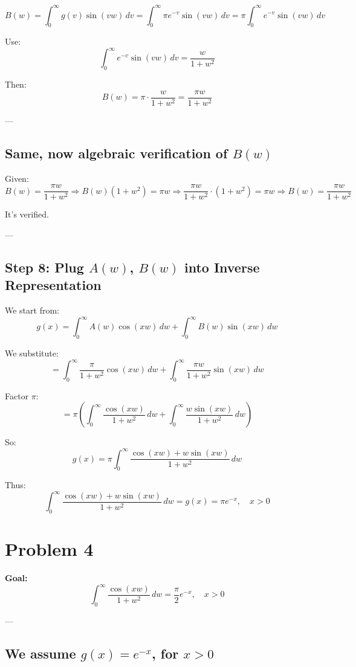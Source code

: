 \documentclass{article}
\begin{document}
\[
B(w) = \int_0^\infty g(v) \sin(vw) \, dv = \int_0^\infty \pi e^{-v} \sin(vw) \, dv = \pi \int_0^\infty e^{-v} \sin(vw) \, dv
\]

Use:
\[
\int_0^\infty e^{-v} \sin(vw) \, dv = \frac{w}{1 + w^2}
\]

Then:
\[
B(w) = \pi \cdot \frac{w}{1 + w^2}
= \frac{\pi w}{1 + w^2}
\]

---

\subsection*{Same, now algebraic verification of \( B(w) \)}

Given:
\[
B(w) = \frac{\pi w}{1 + w^2}
\Rightarrow B(w)(1 + w^2) = \pi w
\Rightarrow \frac{\pi w}{1 + w^2} \cdot (1 + w^2) = \pi w
\Rightarrow B(w) = \frac{\pi w}{1 + w^2}
\]

It's verified.

---

\subsection*{Step 8: Plug \( A(w) \), \( B(w) \) into Inverse Representation}

We start from:
\[
g(x) = \int_0^\infty A(w) \cos(xw) \, dw + \int_0^\infty B(w) \sin(xw) \, dw
\]

We substitute:
\[
= \int_0^\infty \frac{\pi}{1 + w^2} \cos(xw) \, dw + \int_0^\infty \frac{\pi w}{1 + w^2} \sin(xw) \, dw
\]

Factor \( \pi \):
\[
= \pi \left( \int_0^\infty \frac{\cos(xw)}{1 + w^2} \, dw + \int_0^\infty \frac{w \sin(xw)}{1 + w^2} \, dw \right)
\]

So:
\[
g(x) = \pi \int_0^\infty \frac{\cos(xw) + w \sin(xw)}{1 + w^2} \, dw
\]

Thus:
\[
\boxed{
\int_0^\infty \frac{\cos(xw) + w \sin(xw)}{1 + w^2} \, dw = g(x) = \pi e^{-x}, \quad x > 0
}
\]

\newpage
\section*{Problem 4}

\textbf{Goal:}
\[
\boxed{
\int_0^\infty \frac{\cos(xw)}{1 + w^2} \, dw = \frac{\pi}{2} e^{-x}, \quad x > 0
}
\]

---

\subsection*{We assume \( g(x) = e^{-x} \), for \( x > 0 \)}
\end{document}
